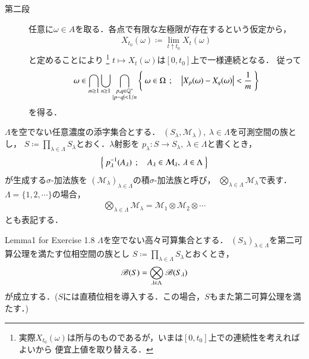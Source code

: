 \begin{prf}
\begin{description}
		\item[第二段]
			任意に$\omega \in A$を取る．各点で有限な左極限が存在するという仮定から，
			\begin{align}
				X_{t_0}(\omega) \coloneqq \lim_{t \uparrow t_0}X_t(\omega)
			\end{align}
			と定めることにより
			\footnote{
				実際$X_{t_0}(\omega)$は所与のものであるが，いまは$[0,t_0]$上での連続性を考えればよいから
				便宜上値を取り替える．
			}
			$t \longmapsto X_t(\omega)$は$[0,t_0]$上で一様連続となる．
			従って
			\begin{align}
				\omega \in \bigcap_{m \geq 1} \bigcup_{n \geq 1} \bigcap_{\substack{p,q \in \mathbb{Q}^* \\ |p-q| < 1/n}}
		\left\{\ \omega \in \Omega\ \, ; \quad \left|X_p(\omega) - X_q(\omega) \right| < \frac{1}{m}\ \right\}
			\end{align}
			を得る．
			\QED
	\end{description}
\end{prf}

\begin{screen}
	\begin{dfn}
		$\Lambda$を空でない任意濃度の添字集合とする．
		$(S_\lambda,\mathcal{M}_\lambda),\ \lambda \in \Lambda$を可測空間の族とし，
		$S \coloneqq \prod_{\lambda \in \Lambda} S_\lambda$とおく．$\lambda$射影を
		$p_\lambda:S \longrightarrow S_\lambda,\ \lambda \in \Lambda$と書くとき，
		\begin{align}
			\left\{\ p_\lambda^{-1}(A_\lambda)\ \, ; \quad A_\lambda \in \mathcal{M}_\lambda,\ \lambda \in \Lambda\ \right\}
		\end{align}
		が生成する$\sigma$-加法族を
		$(\mathcal{M}_\lambda)_{\lambda \in \Lambda}$の積$\sigma$-加法族と呼び，
		$\bigotimes_{\lambda \in \Lambda} \mathcal{M}_\lambda$で表す．
		$\Lambda = \{1,2,\cdots\}$の場合，
		\begin{align}
			\bigotimes_{\lambda \in \Lambda} \mathcal{M}_\lambda
			= \mathcal{M}_1 \otimes \mathcal{M}_2 \otimes \cdots
		\end{align}
		とも表記する．
	\end{dfn}
\end{screen}
\begin{itembox}[l]{Lemma1 for Exercise 1.8}
	$\Lambda$を空でない高々可算集合とする．
	$(S_\lambda)_{\lambda \in \Lambda}$を第二可算公理を満たす位相空間の族とし
	$S \coloneqq \prod_{\lambda \in \Lambda} S_\lambda$とおくとき，
	\begin{align}
		\mathscr{B}(S) = \bigotimes_{\lambda \in \Lambda} \mathscr{B}(S_\lambda)
		\label{eq:lem1_for_chap_1_exercise_1_8_1}
	\end{align}
	が成立する．($S$には直積位相を導入する．この場合，$S$もまた第二可算公理を満たす．)
\end{itembox}

